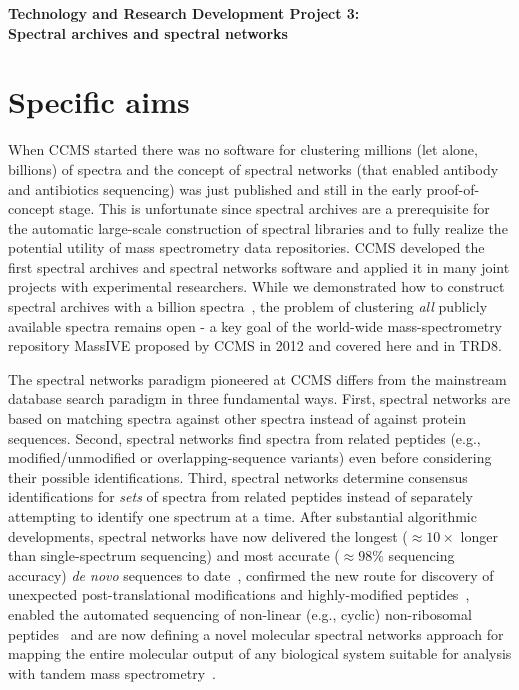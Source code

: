 \documentclass[arial,11pt]{article}
\begin{document}

\begin{center}
{\Large {\bf Technology and Research Development Project 3: \\
Spectral archives and spectral networks}}
\end{center}

\section{Specific aims}

When CCMS started there was no software for clustering millions (let alone, billions) of spectra and the concept of spectral networks (that enabled antibody and antibiotics sequencing) was just published and still in the early proof-of-concept stage. This is unfortunate since spectral archives are a prerequisite for the automatic large-scale construction of spectral libraries and to fully realize the potential utility of mass spectrometry data repositories. CCMS developed the first spectral archives and spectral networks software and applied it in many joint projects with experimental researchers. While we demonstrated how to construct spectral archives with a billion spectra~\cite{frank11}, the problem of clustering {\em all} publicly available spectra remains open - a key goal of the world-wide mass-spectrometry repository MassIVE proposed by CCMS in 2012 and covered here and in TRD8.

The spectral networks paradigm pioneered at CCMS differs from the mainstream database search paradigm in three fundamental ways. First, spectral networks are based on matching spectra against other spectra instead of against protein sequences. Second, spectral networks find spectra from related peptides (e.g., modified/unmodified or overlapping-sequence variants) even before considering their possible identifications. Third, spectral networks determine consensus identifications for {\em sets} of spectra from related peptides instead of separately attempting to identify one spectrum at a time. After substantial algorithmic developments, spectral networks have now delivered the longest ($\approx 10\times$ longer than single-spectrum sequencing) and most accurate ($\approx 98\%$ sequencing accuracy) {\em de novo} sequences to date~\cite{bandeira08,guthals12metasps}, confirmed the new route for discovery of unexpected post-translational modifications and highly-modified peptides~\cite{gonzalez10,yang11,guthals12specnets}, enabled the automated sequencing of non-linear (e.g., cyclic) non-ribosomal peptides~\cite{bandeira08recomb,ng09} and are now defining a novel molecular spectral networks approach for mapping the entire molecular output of any biological system suitable for analysis with tandem mass spectrometry~\cite{watrous12,moree12}.
\end{document}
